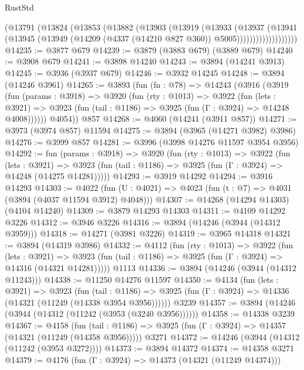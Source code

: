 \begin{lexlean}{RustStd}
\begin{coremodule}
                  (@13791
                    (@13824
                      (@13853
                        (@13882
                          (@13903
                            (@13919
                              (@13933
                                (@13937
                                  (@13941
                                    (@13945
                                      (@13949
                                        (@14209 (@4337 (@14210 @827 @360)) @5005)))))))))))))))))))
@14235 := @3877 @679
@14239 := @3879 (@3883 @679) (@3889 @679)
@14240 := @3908 @679
@14241 := @3898 @14240
@14243 := @3894 (@14241 @3913)
@14245 := @3936 (@3937 @679)
@14246 := @3932 @14245
@14248 := @3894 (@14246 @3961)
@14265 := @3893
    (fun (fn : @78) =>
    @14243
      (@3916
        (@3919
          (fun (params : @3918) =>
          @3920
            (fun (rty : @1013) =>
            @3922
              (fun (lets : @3921) =>
              @3923 (fun (tail : @1186) => @3925 (fun (Γ : @3924) => @14248 @4008))))))
        @4054))
    @857
@14268 := @4060 (@14241 (@3911 @857))
@14271 := @3973 (@3974 @857) @11594
@14275 := @3894 (@3965 (@14271 @3982) @3986)
@14276 := @3999 @857
@14281 := @3996 (@3998 @14276 @11597 @3954 @3956)
@14292 := fun (params : @3918) =>
  @3920
    (fun (rty : @1013) =>
    @3922
      (fun (lets : @3921) =>
      @3923 (fun (tail : @1186) => @3925 (fun (Γ : @3924) => @14248 (@14275 @14281)))))
@14293 := @3919 @14292
@14294 := @3916 @14293
@14303 := @4022
    (fun (U : @4021) => @4023 (fun (t : @7) => @4031 (@3894 (@4037 @11594 @3912) @4048)))
@14307 := @14268 (@14294 @14303) (@4104 @14240)
@14309 := @3879 @14293 @14303
@14311 := @4109 @14292 @3226
@14312 := @3946 @3226
@14316 := @3894 (@14246 (@3944 (@14312 @3959)))
@14318 := @14271 (@3981 @3226)
@14319 := @3965 @14318
@14321 := @3894 (@14319 @3986)
@14332 := @4112
    (fun (rty : @1013) =>
    @3922
      (fun (lets : @3921) =>
      @3923 (fun (tail : @1186) => @3925 (fun (Γ : @3924) => @14316 (@14321 @14281)))))
    @1113
@14336 := @3894 (@14246 (@3944 (@14312 @11243)))
@14338 := @11250 @14276 @11597
@14350 := @4134
    (fun (lets : @3921) =>
    @3923
      (fun (tail : @1186) =>
      @3925 (fun (Γ : @3924) => @14336 (@14321 (@11249 (@14338 @3954 @3956))))))
    @3239
@14357 := @3894 (@14246 (@3944 (@14312 (@11242 (@3953 (@3240 @3956))))))
@14358 := @14338 @3239
@14367 := @4158
    (fun (tail : @1186) => @3925 (fun (Γ : @3924) => @14357 (@14321 (@11249 (@14358 @3956)))))
    @3271
@14372 := @14246 (@3944 (@14312 (@11242 (@3953 @3272))))
@14373 := @3894 @14372
@14374 := @14358 @3271
@14379 := @4176 (fun (Γ : @3924) => @14373 (@14321 (@11249 @14374)))

\end{coremodule}
\end{lexlean}
